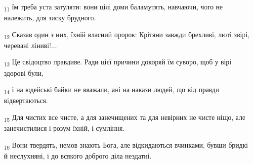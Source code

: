 \begin{tcolorbox}
\textsubscript{11} їм треба уста затуляти: вони цілі доми баламутять, навчаючи, чого не належить, для зиску брудного.
\end{tcolorbox}
\begin{tcolorbox}
\textsubscript{12} Сказав один з них, їхній власний пророк: Крітяни завжди брехливі, люті звірі, черевані ліниві!...
\end{tcolorbox}
\begin{tcolorbox}
\textsubscript{13} Це свідоцтво правдиве. Ради цієї причини докоряй їм суворо, щоб у вірі здорові були,
\end{tcolorbox}
\begin{tcolorbox}
\textsubscript{14} і на юдейські байки не вважали, ані на накази людей, що від правди відвертаються.
\end{tcolorbox}
\begin{tcolorbox}
\textsubscript{15} Для чистих все чисте, а для занечищених та для невірних не чисте ніщо, але занечистилися і розум їхній, і сумління.
\end{tcolorbox}
\begin{tcolorbox}
\textsubscript{16} Вони твердять, немов знають Бога, але відкидаються вчинками, бувши бридкі й неслухняні, і до всякого доброго діла нездатні.
\end{tcolorbox}
